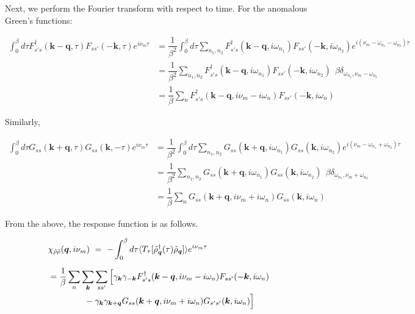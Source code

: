 \documentclass[a4j]{jsarticle}
\begin{document}
Next, we perform the Fourier transform with respect to time.
For the anomalous Green's functions:

\begin{align}
	\int^{\beta}_{0} d \tau
	F_{ s' s }^{\dagger}( \bm{k} - \bm{q} , \tau )
	F_{ s s' } ( - \bm{k} , \tau )
	e^{i \nu_{m} \tau}
	 & =
	\dfrac{1}{\beta^{2}}
	\int^{\beta}_{0} d \tau
	\sum_{n_{1},n_{2}}
	F_{ s' s }^{\dagger}( \bm{k} - \bm{q} , i \omega_{n_{1}} )
	F_{ s s' } ( - \bm{k} , i \omega_{n_{2}} )
	e^{i ( \nu_{m} - \omega_{n_{1}} - \omega_{n_{2}} ) \tau }
	\nonumber \\[2mm] &=
	\dfrac{ 1 }{\beta^{2}} \sum_{n_{1},n_{2}}
	F_{ s' s }^{\dagger}( \bm{k} - \bm{q} , i \omega_{n_{1}} )
	F_{ s s' } ( - \bm{k} , i \omega_{n_{2}} )
	\ \ \beta
	\delta_{ \omega_{n_{1}} , \nu_{m} - \omega_{n_{2}} }
	\nonumber \\[2mm] &=
	\dfrac{ 1 }{\beta} \sum_{n}
	F_{ s' s }^{\dagger}( \bm{k} - \bm{q} , i \nu_{m} - i \omega_{n} )
	F_{ s s' } ( - \bm{k} , i \omega_{n} )
\end{align}

Similarly,

\begin{align}
	\int^{\beta}_{0} d \tau
	G_{ s s } ( \bm{k} + \bm{q} , \tau )
	G_{ s s } ( \bm{k} , - \tau )
	e^{i \nu_{m} \tau}
	 & =
	\dfrac{1}{\beta^{2}}
	\int^{\beta}_{0} d \tau
	\sum_{n_{1},n_{2}}
	G_{ s s } ( \bm{k} + \bm{q} , i \omega_{n_{1}} )
	G_{ s s } ( \bm{k} , i \omega_{n_{2}} )
	e^{i ( \nu_{m} - \omega_{n_{1}} + \omega_{n_{2}} ) \tau }
	\nonumber \\[2mm] &=
	\dfrac{ 1 }{\beta^{2}} \sum_{n_{1},n_{2}}
	G_{ s s } ( \bm{k} + \bm{q} , i \omega_{n_{1}} )
	G_{ s s } ( \bm{k} , i \omega_{n_{2}} )
	\ \ \beta
	\delta_{ \omega_{n_{1}} , \nu_{m} + \omega_{n_{2}} }
	\nonumber \\[2mm] &=
	\dfrac{ 1 }{\beta} \sum_{n}
	G_{ s s } ( \bm{k} + \bm{q} , i \nu_{m} + i \omega_{n} )
	G_{ s s } ( \bm{k} , i \omega_{n} )
\end{align}

From the above, the response function is as follows.

\begin{align}
	 &
	\chi_{\tilde{\rho} \tilde{\rho}}(\bm{q},i \nu_{m})
	\ = \
	-
	\int^{\beta}_{0} d \tau
	\langle T_{\tau}[ \tilde{\rho}_{\bm{q}}^{\dagger} (\tau) \tilde{\rho}_{\bm{q}} ] \rangle
	e^{i \nu_{m} \tau}
	\nonumber \\[2mm]
	 & =
	\dfrac{1}{\beta}
	\sum_{n}
	\sum_{ \bm{k} }
	\sum_{s s'}
	\Big[
		\gamma_{\bm{k}}
		\gamma_{-\bm{k}}
		F_{ s' s }^{\dagger}( \bm{k} - \bm{q} , i \nu_{m} - i \omega_{n} )
		F_{ s s' } ( - \bm{k} , i \omega_{n} )
	\nonumber \\ & \hspace{15mm} -
		\gamma_{\bm{k}}
		\gamma_{\bm{k}+\bm{q}}
		G_{ s s } ( \bm{k} + \bm{q} , i \nu_{m} + i \omega_{n} )
		G_{ s' s' } ( \bm{k} , i \omega_{n} )
		\Big]
\end{align}
\end{document}
